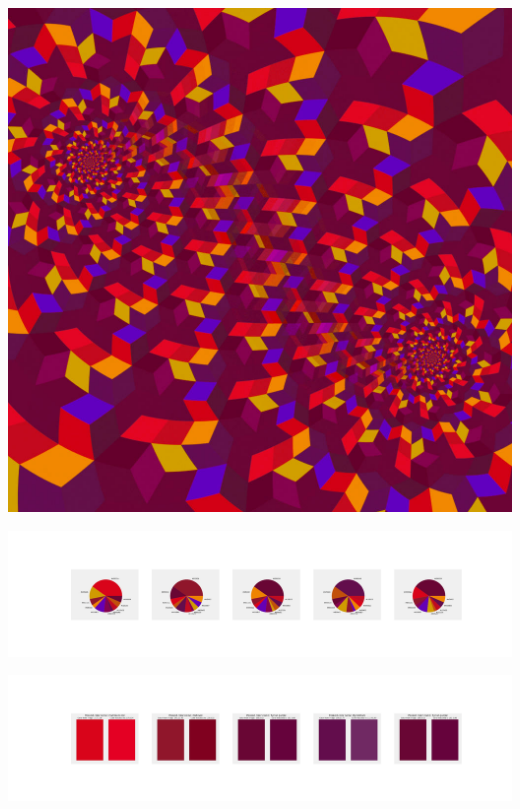 \documentclass[11pt]{article}
\begin{document}
\begin{landscape}
    \begin{center}
    \includegraphics[width=\textwidth]{./nbimg/file (315).jpg}
    \end{center}

    \begin{center}
    \includegraphics[width=250mm]{./nbimg/pie-240.jpg}
    \end{center}

    \begin{center}
    \includegraphics[width=250mm]{./nbimg/peak-240.jpg}
    \end{center}
    


\end{landscape}
\end{document}
